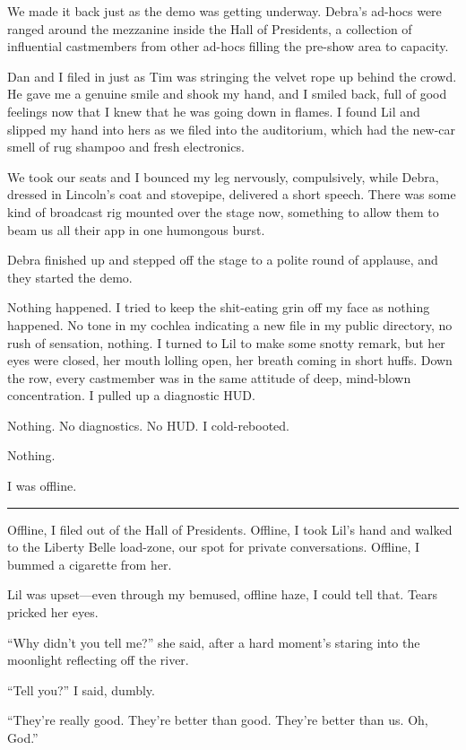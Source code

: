 We made it back just as the demo was getting underway. Debra's
ad-hocs were ranged around the mezzanine inside the Hall of
Presidents, a collection of influential castmembers from other
ad-hocs filling the pre-show area to capacity.

Dan and I filed in just as Tim was stringing the velvet rope up
behind the crowd. He gave me a genuine smile and shook my hand, and
I smiled back, full of good feelings now that I knew that he was
going down in flames. I found Lil and slipped my hand into hers as
we filed into the auditorium, which had the new-car smell of rug
shampoo and fresh electronics.

We took our seats and I bounced my leg nervously, compulsively,
while Debra, dressed in Lincoln's coat and stovepipe, delivered a
short speech. There was some kind of broadcast rig mounted over the
stage now, something to allow them to beam us all their app in one
humongous burst.

Debra finished up and stepped off the stage to a polite round of
applause, and they started the demo.

Nothing happened. I tried to keep the shit-eating grin off my face
as nothing happened. No tone in my cochlea indicating a new file in
my public directory, no rush of sensation, nothing. I turned to Lil
to make some snotty remark, but her eyes were closed, her mouth
lolling open, her breath coming in short huffs. Down the row, every
castmember was in the same attitude of deep, mind-blown
concentration. I pulled up a diagnostic HUD.

Nothing. No diagnostics. No HUD. I cold-rebooted.

Nothing.

I was offline.

\begin{center}\rule{3in}{0.4pt}\end{center}

Offline, I filed out of the Hall of Presidents. Offline, I took
Lil's hand and walked to the Liberty Belle load-zone, our spot for
private conversations. Offline, I bummed a cigarette from her.

Lil was upset—even through my bemused, offline haze, I could tell
that. Tears pricked her eyes.

“Why didn't you tell me?” she said, after a hard moment's staring
into the moonlight reflecting off the river.

“Tell you?” I said, dumbly.

“They're really good. They're better than good. They're better than
us. Oh, God.”

